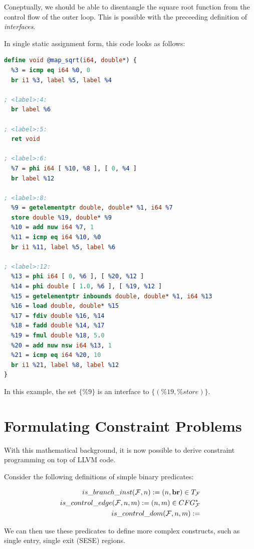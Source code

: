     Coneptually, we should be able to disentangle the square root function from
    the control flow of the outer loop.
    This is possible with the preceeding definition of {\em interfaces}.


\newpage
In single static assignment form, this code looks as follows:

\begin{lstlisting}[language=LLVM]
define void @map_sqrt(i64, double*) {
  %3 = icmp eq i64 %0, 0
  br i1 %3, label %5, label %4

; <label>:4:
  br label %6

; <label>:5:
  ret void

; <label>:6:
  %7 = phi i64 [ %10, %8 ], [ 0, %4 ]
  br label %12

; <label>:8:
  %9 = getelementptr double, double* %1, i64 %7
  store double %19, double* %9
  %10 = add nuw i64 %7, 1
  %11 = icmp eq i64 %10, %0
  br i1 %11, label %5, label %6

; <label>:12:
  %13 = phi i64 [ 0, %6 ], [ %20, %12 ]
  %14 = phi double [ 1.0, %6 ], [ %19, %12 ]
  %15 = getelementptr inbounds double, double* %1, i64 %13
  %16 = load double, double* %15
  %17 = fdiv double %16, %14
  %18 = fadd double %14, %17
  %19 = fmul double %18, 5.0
  %20 = add nuw nsw i64 %13, 1
  %21 = icmp eq i64 %20, 10
  br i1 %21, label %8, label %12
}
\end{lstlisting}

    In this example, the set $\{\%9\}$ is an interface to $\{(\%19,\%store)\}$.

\section{Formulating Constraint Problems}

    With this mathematical background, it is now possible to derive constraint
    programming on top of LLVM code.

    Consider the following definitions of simple binary predicates:

    \begin{align*}
     is\_branch\_inst(\mathcal F, n):= (n,\text{\bf br})\in T_\mathcal{F}\\
     is\_control\_edge(\mathcal F, n, m):= (n,m)\in CFG_\mathcal{F}^*\\
     is\_control\_dom(\mathcal F, n, m):= \\
    \end{align*}

    We can then use these predicates to define more complex constructs, such as
    single entry, single exit (SESE) regions.

